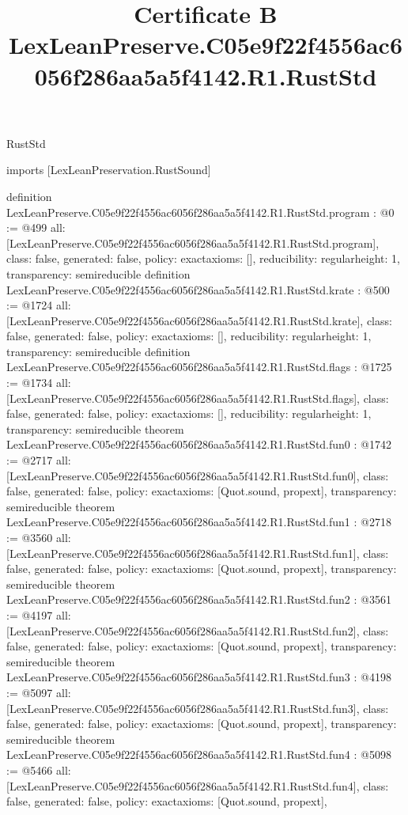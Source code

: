 \begin{lexlean}{RustStd}
\title{Certificate B LexLeanPreserve.C05e9f22f4556ac6056f286aa5a5f4142.R1.RustStd}
\begin{coremodule}
imports [LexLeanPreservation.RustSound]

definition LexLeanPreserve.C05e9f22f4556ac6056f286aa5a5f4142.R1.RustStd.program : @0 := @499 {
  all: [LexLeanPreserve.C05e9f22f4556ac6056f286aa5a5f4142.R1.RustStd.program],
  class: false,
  generated: false,
  policy: exact{axioms: []},
  reducibility: regular{height: 1},
  transparency: semireducible
}
definition LexLeanPreserve.C05e9f22f4556ac6056f286aa5a5f4142.R1.RustStd.krate : @500 := @1724 {
  all: [LexLeanPreserve.C05e9f22f4556ac6056f286aa5a5f4142.R1.RustStd.krate],
  class: false,
  generated: false,
  policy: exact{axioms: []},
  reducibility: regular{height: 1},
  transparency: semireducible
}
definition LexLeanPreserve.C05e9f22f4556ac6056f286aa5a5f4142.R1.RustStd.flags : @1725 := @1734 {
  all: [LexLeanPreserve.C05e9f22f4556ac6056f286aa5a5f4142.R1.RustStd.flags],
  class: false,
  generated: false,
  policy: exact{axioms: []},
  reducibility: regular{height: 1},
  transparency: semireducible
}
theorem LexLeanPreserve.C05e9f22f4556ac6056f286aa5a5f4142.R1.RustStd.fun0 : @1742 := @2717 {
  all: [LexLeanPreserve.C05e9f22f4556ac6056f286aa5a5f4142.R1.RustStd.fun0],
  class: false,
  generated: false,
  policy: exact{axioms: [Quot.sound, propext]},
  transparency: semireducible
}
theorem LexLeanPreserve.C05e9f22f4556ac6056f286aa5a5f4142.R1.RustStd.fun1 : @2718 := @3560 {
  all: [LexLeanPreserve.C05e9f22f4556ac6056f286aa5a5f4142.R1.RustStd.fun1],
  class: false,
  generated: false,
  policy: exact{axioms: [Quot.sound, propext]},
  transparency: semireducible
}
theorem LexLeanPreserve.C05e9f22f4556ac6056f286aa5a5f4142.R1.RustStd.fun2 : @3561 := @4197 {
  all: [LexLeanPreserve.C05e9f22f4556ac6056f286aa5a5f4142.R1.RustStd.fun2],
  class: false,
  generated: false,
  policy: exact{axioms: [Quot.sound, propext]},
  transparency: semireducible
}
theorem LexLeanPreserve.C05e9f22f4556ac6056f286aa5a5f4142.R1.RustStd.fun3 : @4198 := @5097 {
  all: [LexLeanPreserve.C05e9f22f4556ac6056f286aa5a5f4142.R1.RustStd.fun3],
  class: false,
  generated: false,
  policy: exact{axioms: [Quot.sound, propext]},
  transparency: semireducible
}
theorem LexLeanPreserve.C05e9f22f4556ac6056f286aa5a5f4142.R1.RustStd.fun4 : @5098 := @5466 {
  all: [LexLeanPreserve.C05e9f22f4556ac6056f286aa5a5f4142.R1.RustStd.fun4],
  class: false,
  generated: false,
  policy: exact{axioms: [Quot.sound, propext]},
}
\end{coremodule}
\end{lexlean}
